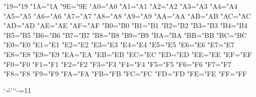 \lccode"19="19 %
\lccode"1A="1A %
\lccode"9E="9E %
\lccode"A0="A0 %
\lccode"A1="A1 %
\lccode"A2="A2 %
\lccode"A3="A3 %
\lccode"A4="A4 %
\lccode"A5="A5 %
\lccode"A6="A6 %
\lccode"A7="A7 %
\lccode"A8="A8 %
\lccode"A9="A9 %
\lccode"AA="AA %
\lccode"AB="AB %
\lccode"AC="AC %
\lccode"AD="AD %
\lccode"AE="AE %
\lccode"AF="AF %
\lccode"B0="B0 %
\lccode"B1="B1 %
\lccode"B2="B2 %
\lccode"B3="B3 %
\lccode"B4="B4 %
\lccode"B5="B5 %
\lccode"B6="B6 %
\lccode"B7="B7 %
\lccode"B8="B8 %
\lccode"B9="B9 %
\lccode"BA="BA %
\lccode"BB="BB %
\lccode"BC="BC %
\lccode"E0="E0 %
\lccode"E1="E1 %
\lccode"E2="E2 %
\lccode"E3="E3 %
\lccode"E4="E4 %
\lccode"E5="E5 %
\lccode"E6="E6 %
\lccode"E7="E7 %
\lccode"E8="E8 %
\lccode"E9="E9 %
\lccode"EA="EA %
\lccode"EB="EB %
\lccode"EC="EC %
\lccode"ED="ED %
\lccode"EE="EE %
\lccode"EF="EF %
\lccode"F0="F0 %
\lccode"F1="F1 %
\lccode"F2="F2 %
\lccode"F3="F3 %
\lccode"F4="F4 %
\lccode"F5="F5 %
\lccode"F6="F6 %
\lccode"F7="F7 %
\lccode"F8="F8 %
\lccode"F9="F9 %
\lccode"FA="FA %
\lccode"FB="FB %
\lccode"FC="FC %
\lccode"FD="FD %
\lccode"FE="FE %
\lccode"FF="FF %

\lccode`\'=`\'
\catcode`-=11


